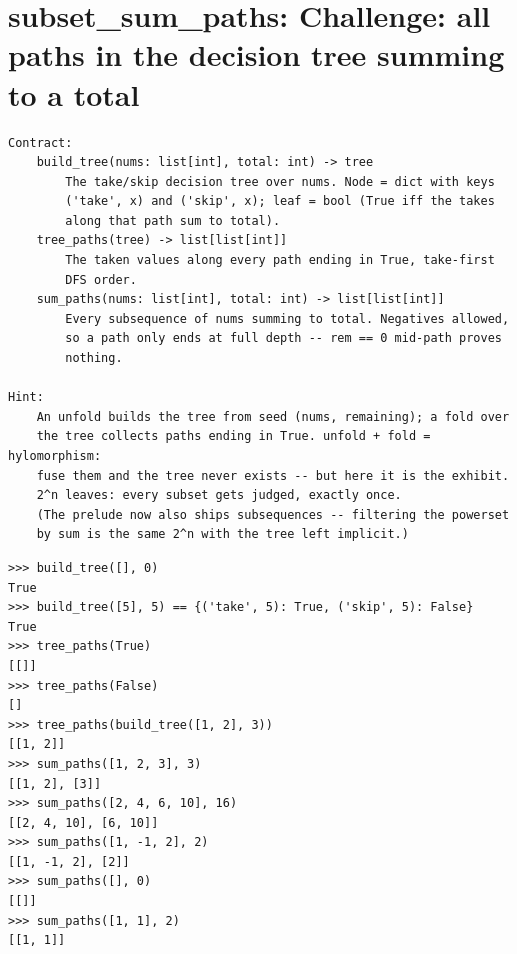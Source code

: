 \documentclass[10pt,letterpaper]{book}
\begin{document}
\section{subset\_sum\_paths: Challenge: all paths in the decision tree summing to a total}
\begin{lstlisting}[style=ex]
Contract:
    build_tree(nums: list[int], total: int) -> tree
        The take/skip decision tree over nums. Node = dict with keys
        ('take', x) and ('skip', x); leaf = bool (True iff the takes
        along that path sum to total).
    tree_paths(tree) -> list[list[int]]
        The taken values along every path ending in True, take-first
        DFS order.
    sum_paths(nums: list[int], total: int) -> list[list[int]]
        Every subsequence of nums summing to total. Negatives allowed,
        so a path only ends at full depth -- rem == 0 mid-path proves
        nothing.

Hint:
    An unfold builds the tree from seed (nums, remaining); a fold over
    the tree collects paths ending in True. unfold + fold = hylomorphism:
    fuse them and the tree never exists -- but here it is the exhibit.
    2^n leaves: every subset gets judged, exactly once.
    (The prelude now also ships subsequences -- filtering the powerset
    by sum is the same 2^n with the tree left implicit.)
\end{lstlisting}
\begin{lstlisting}[style=ex]
>>> build_tree([], 0)
True
>>> build_tree([5], 5) == {('take', 5): True, ('skip', 5): False}
True
>>> tree_paths(True)
[[]]
>>> tree_paths(False)
[]
>>> tree_paths(build_tree([1, 2], 3))
[[1, 2]]
>>> sum_paths([1, 2, 3], 3)
[[1, 2], [3]]
>>> sum_paths([2, 4, 6, 10], 16)
[[2, 4, 10], [6, 10]]
>>> sum_paths([1, -1, 2], 2)
[[1, -1, 2], [2]]
>>> sum_paths([], 0)
[[]]
>>> sum_paths([1, 1], 2)
[[1, 1]]
\end{lstlisting}
\end{document}
